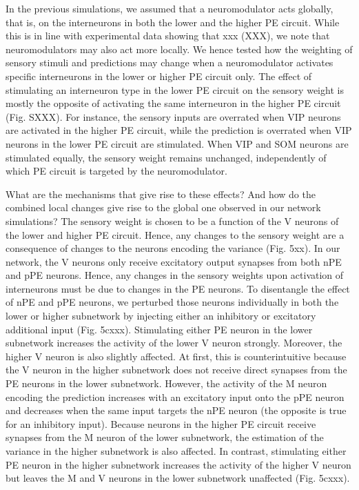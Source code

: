 \documentclass[10pt,a4paper,draft]{article}
\begin{document}
In the previous simulations, we assumed that a neuromodulator acts globally, that is, on the interneurons in both the lower and the higher PE circuit. While this is in line with experimental data showing that xxx (XXX), we note that neuromodulators may also act more locally. We hence tested how the weighting of sensory stimuli and predictions may change when a neuromodulator activates specific interneurons in the lower or higher PE circuit only. The effect of stimulating an interneuron type in the lower PE circuit on the sensory weight is mostly the opposite of activating the same interneuron in the higher PE circuit (Fig. SXXX). For instance, the sensory inputs are overrated when VIP neurons are activated in the higher PE circuit, while the prediction is overrated when VIP neurons in the lower PE circuit are stimulated. When VIP and SOM neurons are stimulated equally, the sensory weight remains unchanged, independently of which PE circuit is targeted by the neuromodulator. 

What are the mechanisms that give rise to these effects? And how do the combined local changes give rise to the global one observed in our network simulations? The sensory weight is chosen to be a function of the V neurons of the lower and higher PE circuit. Hence, any changes to the sensory weight are a consequence of changes to the neurons encoding the variance (Fig. 5xx). In our network, the V neurons only receive excitatory output synapses from both nPE and pPE neurons. Hence, any changes in the sensory weights upon activation of interneurons must be due to changes in the PE neurons. To disentangle the effect of nPE and pPE neurons, we perturbed those neurons individually in both the lower or higher subnetwork by injecting either an inhibitory or excitatory additional input (Fig. 5cxxx). Stimulating either PE neuron in the lower subnetwork increases the activity of the lower V neuron strongly. Moreover, the higher V neuron is also slightly affected. At first, this is counterintuitive because the V neuron in the higher subnetwork does not receive direct synapses from the PE neurons in the lower subnetwork. However, the activity of the M neuron encoding the prediction increases with an excitatory input onto the pPE neuron and decreases when the same input targets the nPE neuron (the opposite is true for an inhibitory input). Because neurons in the higher PE circuit receive synapses from the M neuron of the lower subnetwork, the estimation of the variance in the higher subnetwork is also affected. In contrast, stimulating either PE neuron in the higher subnetwork increases the activity of the higher V neuron but leaves the M and V neurons in the lower subnetwork unaffected (Fig. 5cxxx).
\end{document}
